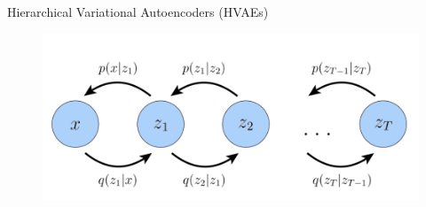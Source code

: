 \begin{frame}{Hierarchical Variational Autoencoders (HVAEs)}
    \begin{figure}
        \centering
        \includegraphics[width=0.9\linewidth]{images/hvae_graph.png}
    \end{figure}
\end{frame}